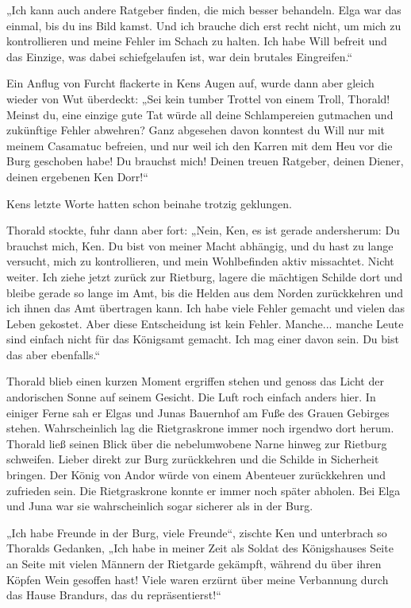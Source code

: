 „Ich kann auch andere Ratgeber finden, die mich besser behandeln. Elga war das einmal, bis du ins Bild kamst. Und ich brauche dich erst recht nicht, um mich zu kontrollieren und meine Fehler im Schach zu halten. Ich habe Will befreit und das Einzige, was dabei schiefgelaufen ist, war dein brutales Eingreifen.“

Ein Anflug von Furcht flackerte in Kens Augen auf, wurde dann aber gleich wieder von Wut überdeckt: „Sei kein tumber Trottel von einem Troll, Thorald! Meinst du, eine einzige gute Tat würde all deine Schlampereien gutmachen und zukünftige Fehler abwehren? Ganz abgesehen davon konntest du Will nur mit meinem Casamatuc befreien, und nur weil ich den Karren mit dem Heu vor die Burg geschoben habe! Du brauchst mich! Deinen treuen Ratgeber, deinen Diener, deinen ergebenen Ken Dorr!“

Kens letzte Worte hatten schon beinahe trotzig geklungen.

Thorald stockte, fuhr dann aber fort: „Nein, Ken, es ist gerade andersherum: Du brauchst mich, Ken. Du bist von meiner Macht abhängig, und du hast zu lange versucht, mich zu kontrollieren, und mein Wohlbefinden aktiv missachtet. Nicht weiter. Ich ziehe jetzt zurück zur Rietburg, lagere die mächtigen Schilde dort und bleibe gerade so lange im Amt, bis die Helden aus dem Norden zurückkehren und ich ihnen das Amt übertragen kann. Ich habe viele Fehler gemacht und vielen das Leben gekostet. Aber diese Entscheidung ist kein Fehler. Manche... manche Leute sind einfach nicht für das Königsamt gemacht. Ich mag einer davon sein. Du bist das aber ebenfalls.“

Thorald blieb einen kurzen Moment ergriffen stehen und genoss das Licht der andorischen Sonne auf seinem Gesicht. Die Luft roch einfach anders hier. In einiger Ferne sah er Elgas und Junas Bauernhof am Fuße des Grauen Gebirges stehen. Wahrscheinlich lag die Rietgraskrone immer noch irgendwo dort herum. Thorald ließ seinen Blick über die nebelumwobene Narne hinweg zur Rietburg schweifen. Lieber direkt zur Burg zurückkehren und die Schilde in Sicherheit bringen. Der König von Andor würde von einem Abenteuer zurückkehren und zufrieden sein. Die Rietgraskrone konnte er immer noch später abholen. Bei Elga und Juna war sie wahrscheinlich sogar sicherer als in der Burg.

„Ich habe Freunde in der Burg, viele Freunde“, zischte Ken und unterbrach so Thoralds Gedanken, „Ich habe in meiner Zeit als Soldat des Königshauses Seite an Seite mit vielen Männern der Rietgarde gekämpft, während du über ihren Köpfen Wein gesoffen hast! Viele waren erzürnt über meine Verbannung durch das Hause Brandurs, das du repräsentierst!“

